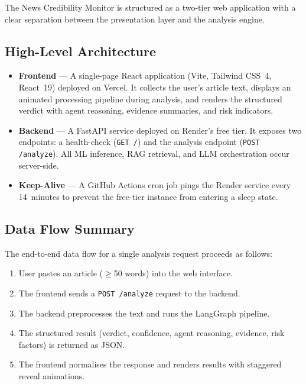 \documentclass[12pt, a4paper]{article}
\begin{document}
The News Credibility Monitor is structured as a two-tier web application
with a clear separation between the presentation layer and the analysis
engine.

\subsection{High-Level Architecture}

\begin{itemize}[leftmargin=2em]
    \item \textbf{Frontend} --- A single-page React application (Vite,
          Tailwind CSS~4, React~19) deployed on Vercel. It collects the
          user's article text, displays an animated processing pipeline
          during analysis, and renders the structured verdict with agent
          reasoning, evidence summaries, and risk indicators.
    \item \textbf{Backend} --- A FastAPI service deployed on Render's free
          tier. It exposes two endpoints: a health-check (\texttt{GET /})
          and the analysis endpoint (\texttt{POST /analyze}). All ML
          inference, RAG retrieval, and LLM orchestration occur server-side.
    \item \textbf{Keep-Alive} --- A GitHub Actions cron job pings the
          Render service every 14~minutes to prevent the free-tier instance
          from entering a sleep state.
\end{itemize}

\subsection{Data Flow Summary}

The end-to-end data flow for a single analysis request proceeds as follows:

\begin{enumerate}[leftmargin=2em]
    \item User pastes an article (\(\geq\)50 words) into the web interface.
    \item The frontend sends a \texttt{POST /analyze} request to the backend.
    \item The backend preprocesses the text and runs the LangGraph pipeline.
    \item The structured result (verdict, confidence, agent reasoning,
          evidence, risk factors) is returned as JSON.
    \item The frontend normalises the response and renders results with
          staggered reveal animations.
\end{enumerate}
\end{document}
